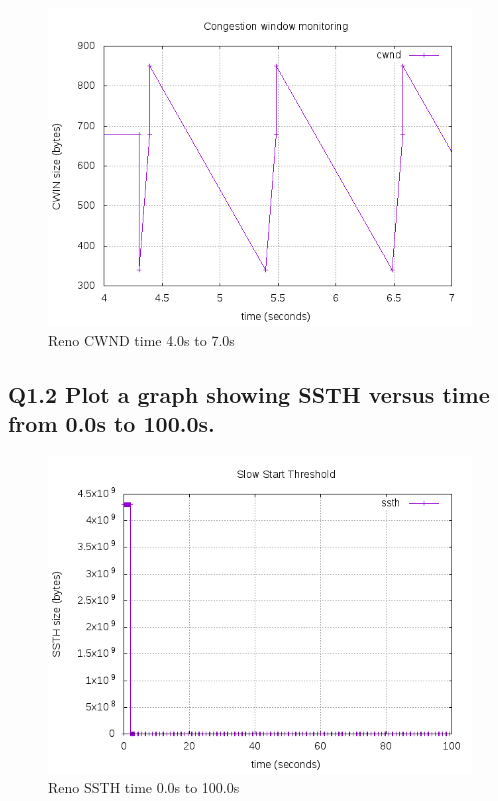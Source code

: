 \documentclass{article}
\begin{document}
\begin{figure}[H]
\centering
\includegraphics[width=12cm]{figures/cwndReno_3.png}
\caption{Reno CWND time 4.0s to 7.0s}
\end{figure}






\subsection{Q1.2 Plot a graph showing SSTH versus time from 0.0s to
100.0s.}


\begin{figure}[H]
\centering
\includegraphics[width=12cm]{figures/ssthReno.png}
\caption{Reno SSTH time 0.0s to 100.0s}
\end{figure}
\end{document}

